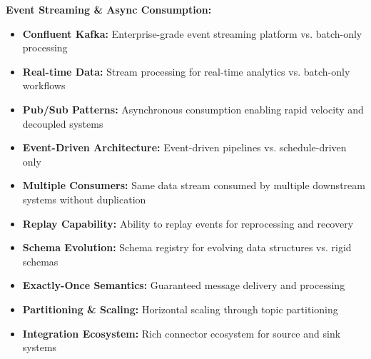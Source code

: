 \documentclass[10pt, a4paper]{article}
\begin{document}
{\hspace{1em}\textbf{Event Streaming \& Async Consumption:}
\begin{itemize}[leftmargin=2.5em, itemsep=0.05em]
    \item \textbf{Confluent Kafka:} Enterprise-grade event streaming platform vs. batch-only processing
    \item \textbf{Real-time Data:} Stream processing for real-time analytics vs. batch-only workflows
    \item \textbf{Pub/Sub Patterns:} Asynchronous consumption enabling rapid velocity and decoupled systems
    \item \textbf{Event-Driven Architecture:} Event-driven pipelines vs. schedule-driven only
    \item \textbf{Multiple Consumers:} Same data stream consumed by multiple downstream systems without duplication
    \item \textbf{Replay Capability:} Ability to replay events for reprocessing and recovery
    \item \textbf{Schema Evolution:} Schema registry for evolving data structures vs. rigid schemas
    \item \textbf{Exactly-Once Semantics:} Guaranteed message delivery and processing
    \item \textbf{Partitioning \& Scaling:} Horizontal scaling through topic partitioning
    \item \textbf{Integration Ecosystem:} Rich connector ecosystem for source and sink systems
\end{itemize}

\vspace{0.15em}

}
\end{document}
